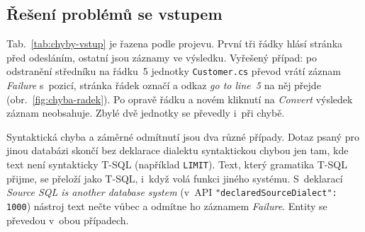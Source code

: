\FloatBarrier
\subsection{Řešení problémů se vstupem}\label{sec:chyby-vstup}

Tab.~\ref{tab:chyby-vstup} je řazena podle projevu. První tři řádky hlásí stránka před odesláním, ostatní jsou záznamy ve výsledku. Vyřešený případ: po odstranění středníku na řádku~5 jednotky \texttt{Customer.cs} převod vrátí záznam \emph{Failure} s~pozicí, stránka řádek označí a odkaz \emph{go to line~5} na něj přejde (obr.~\ref{fig:chyba-radek}). Po opravě řádku a novém kliknutí na \emph{Convert} výsledek záznam neobsahuje. Zbylé dvě jednotky se převedly i~při chybě.


Syntaktická chyba a záměrné odmítnutí jsou dva různé případy. Dotaz psaný pro jinou databázi skončí bez deklarace dialektu syntaktickou chybou jen tam, kde text není syntakticky T-SQL (například \texttt{LIMIT}). Text, který gramatika T-SQL přijme, se přeloží jako T-SQL, i~když volá funkci jiného systému. S~deklarací \emph{Source SQL is another database system} (v~API \texttt{"declaredSourceDialect": 1000}) nástroj text nečte vůbec a odmítne ho záznamem \emph{Failure}. Entity se převedou v~obou případech.

